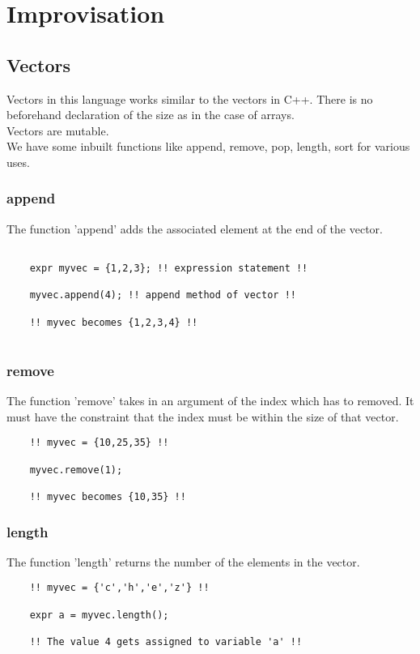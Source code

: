 \documentclass[journal, 18pt]{report}
\begin{document}
\chapter{Improvisation}

\section{Vectors}
Vectors in this language works similar to the vectors in C++. There is no beforehand declaration of the size as in the case of arrays.\\
Vectors are mutable.\\
We have some inbuilt functions like append, remove, pop, length, sort for various uses.
\subsection{append}
The function 'append' adds the associated element at the end of the vector.
\begin{lstlisting}

    expr myvec = {1,2,3}; !! expression statement !!
    
    myvec.append(4); !! append method of vector !!
    
    !! myvec becomes {1,2,3,4} !!
    
\end{lstlisting}
\subsection{remove}
The function 'remove' takes in an argument of the index which has to removed. It must have the constraint that the index must be within the size of that vector.\\
\begin{lstlisting}
    !! myvec = {10,25,35} !!
    
    myvec.remove(1); 

    !! myvec becomes {10,35} !!
\end{lstlisting}
\subsection{length}
The function 'length' returns the number of the elements in the vector.\\
\begin{lstlisting}
    !! myvec = {'c','h','e','z'} !!
    
    expr a = myvec.length();
    
    !! The value 4 gets assigned to variable 'a' !!
\end{lstlisting}
\end{document}
